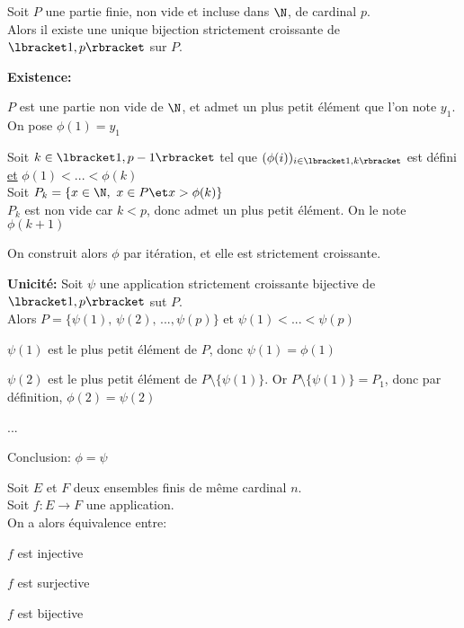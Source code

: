 \documentclass[12pt,twoside,a4paper]{article}
\begin{document}
	\begin{prop}
		Soit $P$ une partie finie, non vide et incluse dans $\N$, de cardinal $p$.\\
		Alors il existe une unique bijection strictement croissante de $\lbracket 1,p\rbracket$ sur $P$.
	\end{prop}
	\begin{preuve}
		\begin{flushleft}
			\textbf{Existence:}
			\begin{liste}
				\item $P$ est une partie non vide de $\N$, et admet un plus petit élément que l'on note $y_1$.\\
					On pose $\phi(1)=y_1$
				\item Soit $k\in \lbracket 1,p-1\rbracket$ tel que $(\phi(i))_{i\in\lbracket 1,k\rbracket}$ est défini \underline{et} $\phi(1)<...<\phi(k)$\\
					Soit $P_k=\{ x\in\N,\ x\in P\et x>\phi(k) \}$\\
					$P_k$ est non vide car $k<p$, donc admet un plus petit élément. On le note $\phi(k+1)$
			\end{liste}
			On construit alors $\phi$ par itération, et elle est strictement croissante.
		\end{flushleft}
		\begin{flushleft}
			\textbf{Unicité:}
			Soit $\psi$ une application strictement croissante bijective de $\lbracket 1,p\rbracket$ sut $P$.\\
			Alors $P=\{\psi(1),\,\psi(2),\,...,\psi(p) \}$ et $\psi(1)<...<\psi(p)$\\
			\begin{liste}
				\item$\psi(1)$ est le plus petit élément de $P$, donc $\psi(1)=\phi(1)$
				\item$\psi(2)$ est le plus petit élément de $P\setminus\{\psi(1) \}$. Or $P\setminus\{\psi(1) \}=P_1$, donc par définition, $\phi(2)=\psi(2)$		
				\item ...
			\end{liste}
			Conclusion: $\phi=\psi$
		\end{flushleft}
	\end{preuve}
	\begin{prop}
		Soit $E$ et $F$ deux ensembles finis de m\^eme cardinal $n$.\\
		Soit $f:E\longrightarrow F$ une application.\\
		On a alors équivalence entre:
		\begin{liste}
			\item[\cercle1] $f$ est injective
			\item[\cercle2] $f$ est surjective
			\item[\cercle3] $f$ est bijective
		\end{liste}
	\end{prop}
\end{document}
